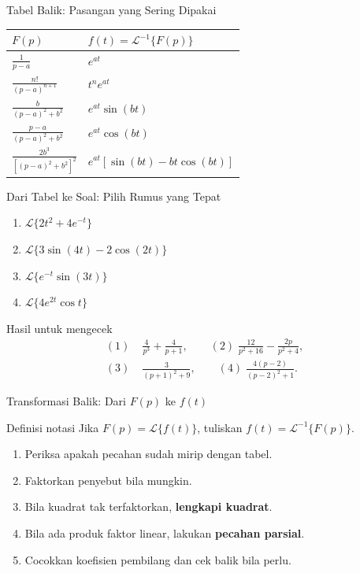 \documentclass[aspectratio=169,11pt]{beamer}
\newcommand{\Lap}{\mathcal{L}}
\newcommand{\invLap}{\mathcal{L}^{-1}}
\begin{document}
\begin{frame}{Tabel Balik: Pasangan yang Sering Dipakai}
\small\centering
\begin{tabular}{p{}p{}}
\toprule
$F(p)$&$f(t)=\invLap\{F(p)\}$\\\midrule
$\displaystyle\frac1{p-a}$&$e^{at}$\\[2mm]
$\displaystyle\frac{n!}{(p-a)^{n+1}}$&$t^n e^{at}$\\[2mm]
$\displaystyle\frac{b}{(p-a)^2+b^2}$&$e^{at}\sin(bt)$\\[2mm]
$\displaystyle\frac{p-a}{(p-a)^2+b^2}$&$e^{at}\cos(bt)$\\[2mm]
$\displaystyle\frac{2b^3}{[(p-a)^2+b^2]^2}$&$e^{at}[\sin(bt)-bt\cos(bt)]$\\[2mm]
\bottomrule
\end{tabular}
\end{frame}

\begin{frame}{Dari Tabel ke Soal: Pilih Rumus yang Tepat}
\begin{enumerate}
\item $\Lap\{2t^2+4e^{-t}\}$
\item $\Lap\{3\sin(4t)-2\cos(2t)\}$
\item $\Lap\{e^{-t}\sin(3t)\}$
\item $\Lap\{4e^{2t}\cos t\}$
\end{enumerate}
\begin{exampleblock}{Hasil untuk mengecek}
\[
\begin{aligned}
(1)\;&\frac4{p^3}+\frac4{p+1},\qquad
(2)\;\frac{12}{p^2+16}-\frac{2p}{p^2+4},\\
(3)\;&\frac3{(p+1)^2+9},\qquad
(4)\;\frac{4(p-2)}{(p-2)^2+1}.
\end{aligned}
\]
\end{exampleblock}
\end{frame}

\begin{frame}{Transformasi Balik: Dari $F(p)$ ke $f(t)$}
\begin{block}{Definisi notasi}
Jika $F(p)=\Lap\{f(t)\}$, tuliskan $f(t)=\invLap\{F(p)\}$.
\end{block}
\begin{enumerate}
\item Periksa apakah pecahan sudah mirip dengan tabel.
\item Faktorkan penyebut bila mungkin.
\item Bila kuadrat tak terfaktorkan, \textbf{lengkapi kuadrat}.
\item Bila ada produk faktor linear, lakukan \textbf{pecahan parsial}.
\item Cocokkan koefisien pembilang dan cek balik bila perlu.
\end{enumerate}
\end{frame}
\end{document}
